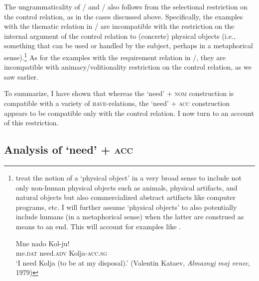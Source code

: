 \documentclass[output=paper]{langscibook}
\begin{document}
\ea
{}
\z\z

\noindent The ungrammaticality of / and  / also follows from the selectional restriction on the control relation, as in the cases discussed above. Specifically, the examples with the thematic relation in / are incompatible with the restriction on the internal argument of the control relation to (concrete) physical objects (i.e., something that can be used or handled by the subject, perhaps in a metaphorical sense).\footnote{\citet{Vikner.Jensen2002} treat the notion of a `physical object' in a very broad sense to include not only non-human physical objects such as animals, physical artifacts, and natural objects but also commercialized abstract artifacts like computer programs, etc. I will further assume `physical objects' to also potentially include humans (in a metaphorical sense) when the latter are construed as means to an end. This will account for examples like .

\ea \label{nuzhno-control-anim}
\gll Mne nado Kol-ju!\\
me.\textsc{dat} need.\textsc{adv} Kolja-\textsc{acc.sg}\\
\glt `I need Kolja (to be at my disposal).’ \hfill (Valentin Kataev, \textit{Almaznyj moj venec}, 1979)
\z
} As for the examples with the requirement relation in /, they are incompatible with animacy/volitionality restriction on the control relation, as we saw earlier.

To summarize, I have shown that whereas the `need' + \textsc{nom} construction is compatible with a variety of \textsc{have}-relations, the `need' + \textsc{acc} construction appears to be compatible only with the control relation. I now turn to an account of this restriction.

\subsection{Analysis of `need' + \textsc{acc}}\label{section-acc-analysis}
\end{document}
